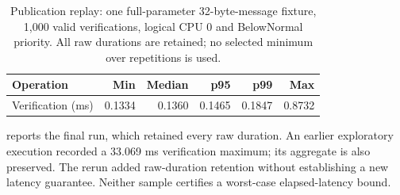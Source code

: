 \begin{table}[t]
\caption{Publication replay: one full-parameter 32-byte-message fixture, 1,000 valid verifications, logical CPU 0 and BelowNormal priority. All raw durations are retained; no selected minimum over repetitions is used.}
\label{tab:replay}
\centering\small
\begin{tabular}{lrrrrr}\toprule
Operation & Min & Median & p95 & p99 & Max\\\midrule
Verification (ms) & 0.1334 & 0.1360 & 0.1465 & 0.1847 & 0.8732\\\bottomrule
\end{tabular}
\end{table}
 reports the final run, which retained every raw duration. An earlier exploratory execution recorded a 33.069 ms verification maximum; its aggregate is also preserved. The rerun added raw-duration retention without establishing a new latency guarantee. Neither sample certifies a worst-case elapsed-latency bound.
